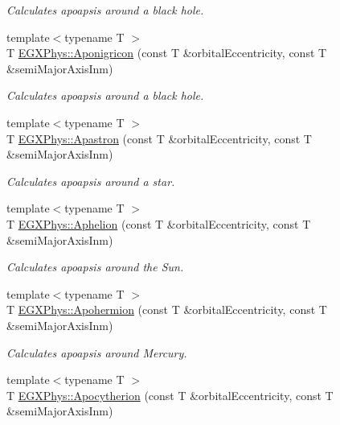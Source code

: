 \begin{DoxyCompactItemize}
\begin{DoxyCompactList}\small\item\em Calculates apoapsis around a black hole. \end{DoxyCompactList}\item 
{\footnotesize template$<$typename T $>$ }\\T \mbox{\hyperlink{group___e_g_x_phys-_apoapsis_gabceed387c4cdd53b8ccebafe2e8da8e1}{E\+G\+X\+Phys\+::\+Aponigricon}} (const T \&orbital\+Eccentricity, const T \&semi\+Major\+Axis\+Inm)
\begin{DoxyCompactList}\small\item\em Calculates apoapsis around a black hole. \end{DoxyCompactList}\item 
{\footnotesize template$<$typename T $>$ }\\T \mbox{\hyperlink{group___e_g_x_phys-_apoapsis_ga809627c2522d7b4db0f27d6ea89e4f89}{E\+G\+X\+Phys\+::\+Apastron}} (const T \&orbital\+Eccentricity, const T \&semi\+Major\+Axis\+Inm)
\begin{DoxyCompactList}\small\item\em Calculates apoapsis around a star. \end{DoxyCompactList}\item 
{\footnotesize template$<$typename T $>$ }\\T \mbox{\hyperlink{group___e_g_x_phys-_apoapsis_ga31b1bd55ee4ebe33f2af6827bfe30515}{E\+G\+X\+Phys\+::\+Aphelion}} (const T \&orbital\+Eccentricity, const T \&semi\+Major\+Axis\+Inm)
\begin{DoxyCompactList}\small\item\em Calculates apoapsis around the Sun. \end{DoxyCompactList}\item 
{\footnotesize template$<$typename T $>$ }\\T \mbox{\hyperlink{group___e_g_x_phys-_apoapsis_ga50a476b4a3c9be6ded8308a247bf001c}{E\+G\+X\+Phys\+::\+Apohermion}} (const T \&orbital\+Eccentricity, const T \&semi\+Major\+Axis\+Inm)
\begin{DoxyCompactList}\small\item\em Calculates apoapsis around Mercury. \end{DoxyCompactList}\item 
{\footnotesize template$<$typename T $>$ }\\T \mbox{\hyperlink{group___e_g_x_phys-_apoapsis_ga75bd80071f792bd75d609fec8dca17b1}{E\+G\+X\+Phys\+::\+Apocytherion}} (const T \&orbital\+Eccentricity, const T \&semi\+Major\+Axis\+Inm)

\end{DoxyCompactItemize}

